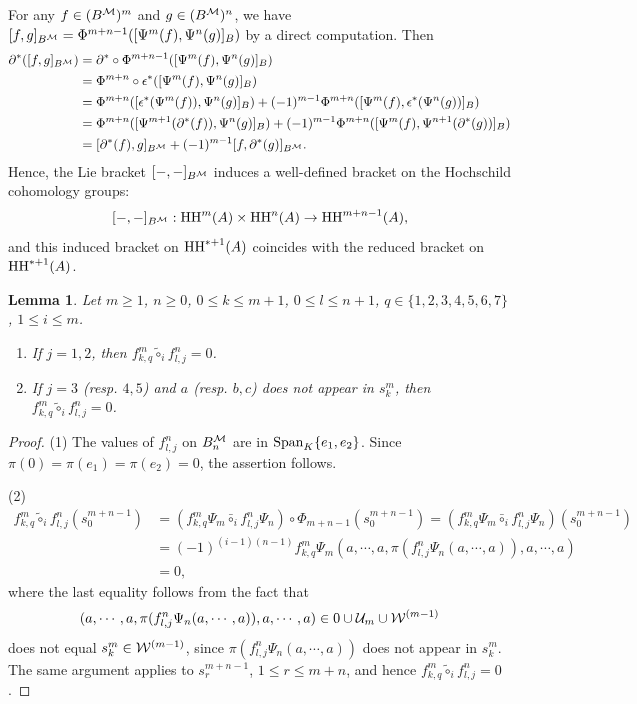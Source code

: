 \documentclass[10pt, reqno]{amsart}
\newtheorem{lem}[theorem]{Lemma}
\theoremstyle{definition}
\theoremstyle{remark}
\numberwithin{equation}{section}
\begin{document}
For any \(f\in (B^{\mathcal{M}})^m \) and \(g\in (B^{\mathcal{M}})^n\), we have $[f,g]_{B^{\mathcal{M}}} = \Phi^{m+n-1} ([\Psi^{m}(f), \Psi^{n}(g)]_B)$ by a direct computation. Then
\[\begin{aligned}
    \partial^*([f,g]_{B^{\mathcal{M}}}) &= \partial^*\circ \Phi^{m+n-1} ([\Psi^{m}(f), \Psi^{n}(g)]_B) \\
    &= \Phi^{m+n}\circ\epsilon^* ([\Psi^{m}(f), \Psi^{n}(g)]_B) \\
    &= \Phi^{m+n} ([\epsilon^*(\Psi^{m}(f)), \Psi^{n}(g)]_B) +(-1)^{m-1} \Phi^{m+n} ([\Psi^{m}(f), \epsilon^*(\Psi^{n}(g))]_B)\\
    &=\Phi^{m+n} ([\Psi^{m+1}(\partial^*(f)), \Psi^{n}(g)]_B) +(-1)^{m-1}  \Phi^{m+n} ([\Psi^{m}(f), \Psi^{n+1}(\partial^*(g))]_B) \\
    &=[\partial^*(f),g]_{B^{\mathcal{M}}} + (-1)^{m-1} [f, \partial^*(g)]_{B^{\mathcal{M}}}.
\end{aligned} \]
Hence, the Lie bracket \([-, -]_{B^{\mathcal{M}}}\) induces a well-defined bracket on the Hochschild cohomology groups:
\[[-,-]_{B^{\mathcal{M}}}: \mathrm{HH}^m(A) \times \mathrm{HH}^n(A) \to \mathrm{HH}^{m+n-1}(A),\]
and this induced bracket on \(\mathrm{HH}^{*+1}(A)\) coincides with the reduced bracket on \(\mathrm{HH}^{*+1}(A)\).

\begin{lem} \label{lem: easy circle product}
    Let \(m\ge 1\), \(n\ge 0\), \(0\le k \le m+1\), \(0\le l \le n+1\), \(q\in \{1,2,3,4,5,6,7\}\), \(1 \le i \le m\).
    \begin{enumerate}
        \item If \(j=1,2\), then \(f_{k,q}^m \tilde{\circ}_i f_{l,j}^n =0\).
        \item If \(j=3\) \textup{(}resp. \(4,5\)\textup{)} and \(a\) \textup{(}resp. \(b,c\)\textup{)} does not appear in \(s_k^m\), then \(f_{k,q}^m \tilde{\circ}_i f_{l,j}^n =0\).
    \end{enumerate}
\end{lem}

\begin{proof}
    (1) The values of \(f_{l,j}^n\) on $B_n^{\mathcal{M}}$ are in \(\mathrm{Span}_K\{e_1,e_2\}\). Since \(\pi(0)= \pi(e_1)=\pi (e_2)=0\), the assertion follows.
    
    (2) \[\begin{aligned}
        f_{k,q}^m \tilde{\circ}_i f_{l,j}^n(s_0^{m+n-1}) &=(f_{k,q}^m\Psi_m \bar{\circ} _i f_{l,j}^n\Psi_n)\circ\Phi_{m+n-1}(s_0^{m+n-1})= (f_{k,q}^m\Psi_m \bar{\circ} _i f_{l,j}^n\Psi_n)(s_0^{m+n-1})\\
        &= (-1)^{(i-1)(n-1)}f_{k,q}^m\Psi_m(a,\cdots,a,\pi(f_{l,j}^n\Psi_n(a,\cdots,a)),a,\cdots,a)\\
       &=0,
     \end{aligned}\]
   where the last equality follows from the fact that 
   $$(a,\cdots,a,\pi(f_{l,j}^n\Psi_n(a,\cdots,a)),a,\cdots,a) \in {0}\cup \mathcal{U}_m\cup \mathcal{W}^{(m-1)}$$ does not equal \(s_k^m \in \mathcal{W}^{(m-1)}\), since $\pi(f_{l,j}^n\Psi_n(a,\cdots,a))$ does not appear in \(s_k^m\). The same argument applies to \(s_r^{m+n-1}\), \(1\le r \le m+n\), and hence \( f_{k,q}^m \tilde{\circ}_i f_{l,j}^n=0\).
\end{proof}
\end{document}
